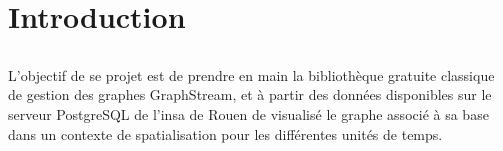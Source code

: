 \chapter{Introduction}

\section*{}
L'objectif de se projet est de prendre en main la bibliothèque gratuite classique de gestion des graphes GraphStream, et à partir des données disponibles sur le serveur PostgreSQL de l'insa de Rouen de visualisé le graphe associé à sa base dans un contexte de spatialisation pour les différentes unités de temps.
\section*{}
